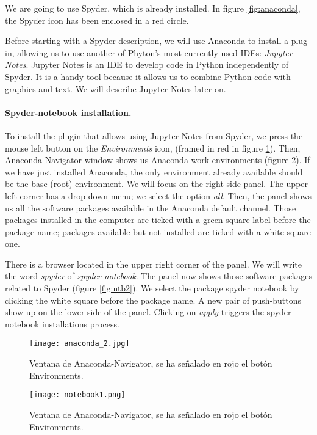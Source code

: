 \begin{paracol}{2}
 We are going to use Spyder, which is already installed. In figure \ref{fig:anaconda}, the Spyder icon has been enclosed in a red circle.

 Before starting with a Spyder description, we will use Anaconda to install a plug-in, allowing us to use another of Phyton's most currently used IDEs: \emph{Jupyter Notes}. Jupyter Notes is an IDE to develop code in Python independently of Spyder. It is a handy tool because it allows us to combine Python code with graphics and text. We will describe Jupyter Notes later on.

 \paragraph{Spyder-notebook installation.} To install the plugin that allows using Jupyter Notes from Spyder, we press the mouse left button on the \emph{Environments} icon, (framed in red in figure \ref{fig:anaconda2}). Then, Anaconda-Navigator window shows us Anaconda work environments (figure \ref{fig:ntb1}). If we have just installed Anaconda, the only environment already available should be the base (root) environment. We will focus on the right-side panel. The upper left corner has a drop-down menu; we select the option \emph{all}. Then, the panel shows us all the software packages available in the Anaconda default channel. Those packages installed in the computer are ticked with a green square label before the package name; packages available but not installed are ticked with a white square one.

 There is a browser located in the upper right corner of the panel. We will write the word \emph{spyder} of \emph{spyder notebook}. The panel now shows those software packages related to Spyder (figure \ref{fig:ntb2}). We select the package spyder notebook by clicking the white square before the package name. A new pair of push-buttons show up on the lower side of the panel. Clicking on \emph{apply} triggers the spyder notebook installations process.  
\end{paracol}
 
\begin{figure}
\centering
\texttt{[image: anaconda\_2.jpg]}
\label{fig:anaconda2}
\caption{Ventana de Anaconda-Navigator, se ha señalado en rojo el botón Environments.}
\end{figure}

\begin{figure}
\centering
    \texttt{[image: notebook1.png]}
    \label{fig:ntb1}
    \caption{Ventana de Anaconda-Navigator, se ha señalado en rojo el botón Environments.}
\end{figure}

